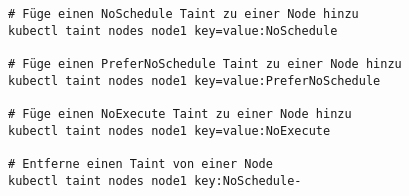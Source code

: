 \begin{verbatim}
# Füge einen NoSchedule Taint zu einer Node hinzu
kubectl taint nodes node1 key=value:NoSchedule

# Füge einen PreferNoSchedule Taint zu einer Node hinzu
kubectl taint nodes node1 key=value:PreferNoSchedule

# Füge einen NoExecute Taint zu einer Node hinzu
kubectl taint nodes node1 key=value:NoExecute

# Entferne einen Taint von einer Node
kubectl taint nodes node1 key:NoSchedule-
\end{verbatim}
